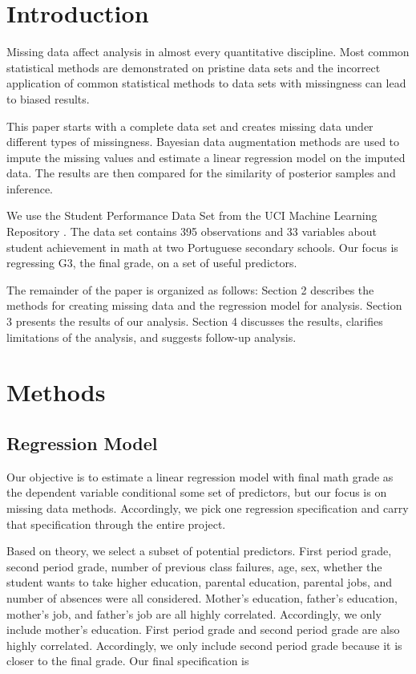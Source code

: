 \documentclass[11pt]{article}
\begin{document}
\section{Introduction}

Missing data affect analysis in almost every quantitative discipline. Most common statistical methods are demonstrated on pristine data sets and the incorrect application of common statistical methods to data sets with missingness can lead to biased results. 

This paper starts with a complete data set and creates missing data under different types of missingness. Bayesian data augmentation methods are used to impute the missing values and estimate a linear regression model on the imputed data. The results are then compared for the similarity of posterior samples and inference.

We use the Student Performance Data Set from the UCI Machine Learning Repository \cite{Cortez2008}. The data set contains 395 observations and 33 variables about student achievement in math at two Portuguese secondary schools. Our focus is regressing G3, the final grade, on a set of useful predictors.  

The remainder of the paper is organized as follows: Section 2 describes the methods for creating missing data and the regression model for analysis. Section 3 presents the results of our analysis. Section 4 discusses the results, clarifies limitations of the analysis, and suggests follow-up analysis. 

\section{Methods}

\subsection{Regression Model}

Our objective is to estimate a linear regression model with final math grade as the dependent variable conditional some set of predictors, but our focus is on missing data methods. Accordingly, we pick one regression specification and carry that specification through the entire project. 

Based on theory, we select a subset of potential predictors. First period grade, second period grade, number of previous class failures, age, sex, whether the student wants to take higher education, parental education, parental jobs, and number of absences were all considered. Mother's education, father's education, mother's job, and father's job are all highly correlated. Accordingly, we only include mother's education. First period grade and second period grade are also highly correlated. Accordingly, we only include second period grade because it is closer to the final grade. Our final specification is 
\end{document}
